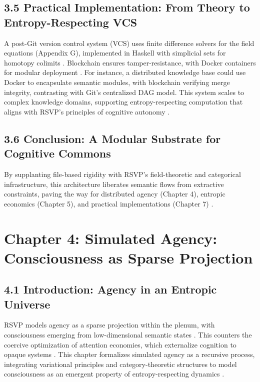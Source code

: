 \documentclass[12pt]{article}
\begin{document}
\subsection*{3.5 Practical Implementation: From Theory to Entropy-Respecting VCS}

A post-Git version control system (VCS) uses finite difference solvers for the field equations (Appendix G), implemented in Haskell with simplicial sets for homotopy colimits \citep{milewski2018}. Blockchain ensures tamper-resistance, with Docker containers for modular deployment \citep{bird1988}. For instance, a distributed knowledge base could use Docker to encapsulate semantic modules, with blockchain verifying merge integrity, contrasting with Git’s centralized DAG model. This system scales to complex knowledge domains, supporting entropy-respecting computation that aligns with RSVP’s principles of cognitive autonomy \citep{whitehead1978}.

\subsection*{3.6 Conclusion: A Modular Substrate for Cognitive Commons}

By supplanting file-based rigidity with RSVP’s field-theoretic and categorical infrastructure, this architecture liberates semantic flows from extractive constraints, paving the way for distributed agency (Chapter 4), entropic economics (Chapter 5), and practical implementations (Chapter 7) \citep{deleuze1987, whitehead1978}.

\section*{Chapter 4: Simulated Agency: Consciousness as Sparse Projection}

\subsection*{4.1 Introduction: Agency in an Entropic Universe}

RSVP models agency as a sparse projection within the plenum, with consciousness emerging from low-dimensional semantic states \citep{friston2010, tononi2004}. This counters the coercive optimization of attention economies, which externalize cognition to opaque systems \citep{zuboff2019, lanier2018}. This chapter formalizes simulated agency as a recursive process, integrating variational principles and category-theoretic structures to model consciousness as an emergent property of entropy-respecting dynamics \citep{hohwy2013}.
\end{document}
